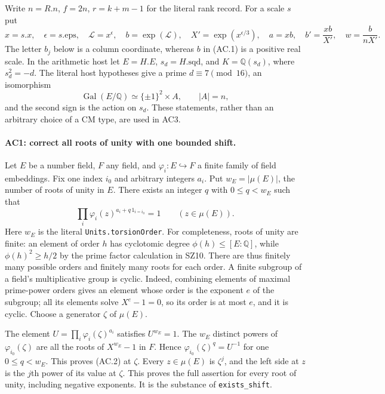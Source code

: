\documentclass[11pt,a4paper]{article}
\numberwithin{equation}{section}
\theoremstyle{remark}\newtheorem{remark}[theorem]{Remark}
\begin{document}
Write $n=R.n$, $f=2n$, $r=k+m-1$ for the literal rank record. For a scale
$s$ put
\[
 x=s.x,\quad \epsilon=s.\mathrm{eps},\quad
 \mathcal L=x^\epsilon,\quad b=\exp(\mathcal L),\quad
 X'=\exp(x^{\epsilon/3}),\quad
 a=xb,\quad b'=\frac{xb}{X'},\quad w=\frac{b}{nX'}.
                                                               \tag{AC.1}
\]
The letter $b_j$ below is a column coordinate, whereas $b$ in (AC.1)
is a positive real scale. In the arithmetic host let
$E=H.E$, $s_d=H.\mathrm{sqd}$, and
$K=\mathbb Q(s_d)$, where $s_d^2=-d$.
The literal host hypotheses give a prime $d\equiv7\pmod {16}$,
an isomorphism
\[
 \operatorname{Gal}(E/\mathbb Q)
       \simeq\{\pm1\}^2\times A,
 \qquad |A|=n,
\]
and the second sign is the action on $s_d$.
These statements, rather than an arbitrary choice of a CM type, are
used in AC3.

\paragraph{AC1: correct all roots of unity with one bounded shift.}
Let $E$ be a number field, $F$ any field, and
$\varphi_i:E\hookrightarrow F$ a finite family of field embeddings.
Fix one index $i_0$ and arbitrary integers $a_i$. Put
$w_E=|\mu(E)|$, the number of roots of unity in $E$.
There exists an integer $q$ with $0\leq q<w_E$ such that
\[
       \prod_i\varphi_i(z)^{a_i+q\,1_{i=i_0}}=1
                  \qquad(z\in\mu(E)).                       \tag{AC.2}
\]
Here $w_E$ is the literal \texttt{Units.torsionOrder}.
For completeness, roots of unity are finite: an element of order $h$
has cyclotomic degree $\phi(h)\leq[E:\mathbb Q]$, while
$\phi(h)^2\geq h/2$ by the prime factor calculation in SZ10.
There are thus finitely many possible orders and finitely many roots
for each order. A finite subgroup of a field's multiplicative group is
cyclic. Indeed, combining elements of maximal prime-power orders gives
an element whose order is the exponent $e$ of the subgroup; all its
elements solve $X^e-1=0$, so its order is at most $e$, and it is cyclic.
Choose a generator $\zeta$ of $\mu(E)$.

The element
$U=\prod_i\varphi_i(\zeta)^{a_i}$ satisfies $U^{w_E}=1$.
The $w_E$ distinct powers of $\varphi_{i_0}(\zeta)$ are all the roots
of $X^{w_E}-1$ in $F$. Hence
$\varphi_{i_0}(\zeta)^q=U^{-1}$ for one $0\leq q<w_E$.
This proves (AC.2) at $\zeta$. Every $z\in\mu(E)$ is $\zeta^j$,
and the left side at $z$ is the $j$th power of its value at $\zeta$.
This proves the full assertion for every root of unity, including
negative exponents. It is the substance of \texttt{exists\_\allowbreak shift}.
\end{document}
